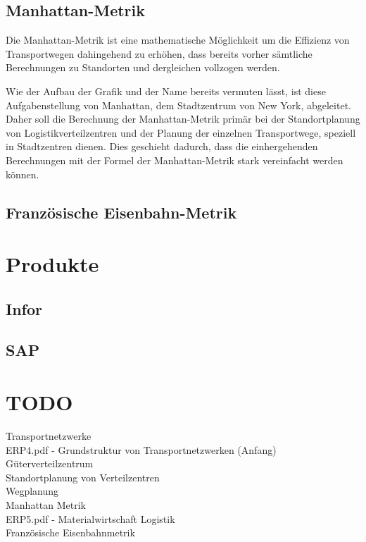\documentclass[a4paper,12pt]{scrreprt}
\begin{document}
	\section{Manhattan-Metrik}
	Die Manhattan-Metrik ist eine mathematische Möglichkeit um die Effizienz von Transportwegen dahingehend zu erhöhen, dass bereits vorher sämtliche Berechnungen zu Standorten und dergleichen vollzogen werden.
	

	Wie der Aufbau der Grafik und der Name bereits vermuten lässt, ist diese Aufgabenstellung von Manhattan, dem Stadtzentrum von New York, abgeleitet.\\
	
	Daher soll die Berechnung der Manhattan-Metrik primär bei der Standortplanung von Logistikverteilzentren und der Planung der einzelnen Transportwege, speziell in Stadtzentren dienen. Dies geschieht dadurch, dass die einhergehenden Berechnungen mit der Formel der Manhattan-Metrik stark vereinfacht werden können. 
	
	\section{Französische Eisenbahn-Metrik}
	
	\chapter{Produkte}
	\section{Infor}
	
	\section{SAP}
	
	
	\chapter{TODO}
	Transportnetzwerke\\
	ERP4.pdf - Grundstruktur von Transportnetzwerken (Anfang)\\
	Güterverteilzentrum\\
	Standortplanung von Verteilzentren\\
	Wegplanung\\
	Manhattan Metrik\\
	ERP5.pdf - Materialwirtschaft Logistik\\
	Französische Eisenbahnmetrik\\
\end{document}
